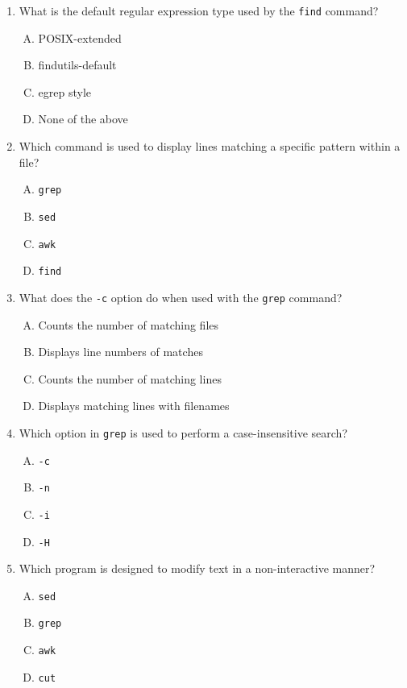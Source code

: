 \documentclass[a4paper]{report}
\begin{document}
\begin{enumerate}[1.]
    \item What is the default regular expression type used by the \texttt{find} command?  
    \begin{enumerate}[A)]
        \item POSIX-extended  
        \item findutils-default  
        \item egrep style  
        \item None of the above  
    \end{enumerate}

    \item Which command is used to display lines matching a specific pattern within a file?  
    \begin{enumerate}[A)]
        \item \texttt{grep}  
        \item \texttt{sed}  
        \item \texttt{awk}  
        \item \texttt{find}  
    \end{enumerate}

    \item What does the \texttt{-c} option do when used with the \texttt{grep} command?  
    \begin{enumerate}[A)]
        \item Counts the number of matching files  
        \item Displays line numbers of matches  
        \item Counts the number of matching lines  
        \item Displays matching lines with filenames  
    \end{enumerate}

    \item Which option in \texttt{grep} is used to perform a case-insensitive search?  
    \begin{enumerate}[A)]
        \item \texttt{-c}  
        \item \texttt{-n}  
        \item \texttt{-i}  
        \item \texttt{-H}  
    \end{enumerate}

    \item Which program is designed to modify text in a non-interactive manner?  
    \begin{enumerate}[A)]
        \item \texttt{sed}  
        \item \texttt{grep}  
        \item \texttt{awk}  
        \item \texttt{cut}  
    \end{enumerate}


\end{enumerate}
\end{document}
